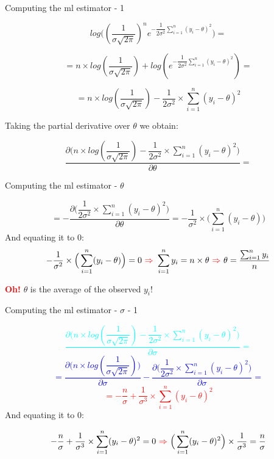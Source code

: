 \documentclass{beamer}
\begin{document}
\begin{frame}
{\centerline{Computing the ml estimator - 1}}

$$log\big((\dfrac 1 {\sigma \sqrt{2 \pi} } )^{n} e^{-   \dfrac { 1 } {2 \sigma^2} \sum_{i=1}^n  ({y_i - \theta})^2} ) =$$

$$= n \times log (\dfrac 1 {\sigma \sqrt{2 \pi} }) + log(e^{ - \dfrac { 1 } {2 \sigma^2} \sum_{i=1}^n  ({y_i - \theta})^2}) =$$

$$= n \times log (\dfrac 1 {\sigma \sqrt{2 \pi} }) - \dfrac { 1 } {2 \sigma^2} \times \sum_{i=1}^n  ({y_i - \theta})^2 $$

Taking the partial derivative over $\theta$ we obtain: 

$$\frac{\partial \Big(n \times log (\dfrac 1 {\sigma \sqrt{2 \pi} }) - \dfrac { 1 } {2 \sigma^2} \times \sum_{i=1}^n  ({y_i - \theta})^2 \Big)}{\partial \theta} = $$


\end{frame}

\begin{frame}
{\centerline{Computing the ml estimator - $\theta$}}

$$ = - \frac{\partial \Big( \dfrac { 1 } {2 \sigma^2} \times \sum_{i=1}^n  ({y_i - \theta})^2 \Big)}{\partial \theta} = - \dfrac { 1 } {\sigma^2} \times \Big( \sum_{i=1}^n  ({y_i - \theta}) \Big) $$
And equating it to 0:
$$ - \dfrac { 1 } {\sigma^2} \times \Big( \sum_{i=1}^n  ({y_i - \theta}) \Big) = 0 ~\textcolor{red}{\Rightarrow}~
 \sum_{i=1}^n y_i = n \times \theta 
~\textcolor{red}{\Rightarrow}~
 \theta = \frac {\sum_{i=1}^n y_i} n  $$
 
\textcolor{red}{\bf Oh!} $\theta$ is the average of the observed $y_i$!

\end{frame}

\begin{frame}
{\centerline{Computing the ml estimator - $\sigma$ - 1}}
\textcolor{cyan}{
$$\frac{\partial \Big(n \times log (\dfrac 1 {\sigma \sqrt{2 \pi} }) - \dfrac { 1 } {2 \sigma^2} \times \sum_{i=1}^n  ({y_i - \theta})^2 \Big)}{\partial \sigma} = $$
}\textcolor{blue}{
$$ = \frac{\partial\Big( n \times log (\dfrac 1 {\sigma \sqrt{2 \pi} })\Big) }{\partial \sigma} - \frac{\partial \Big( \dfrac { 1 } {2 \sigma^2} \times \sum_{i=1}^n  ({y_i - \theta})^2 \Big)}{\partial \sigma} = $$
}\textcolor{red}{
$$  = - \frac n {\sigma} + \frac 1 {\sigma^3} \times \sum_{i=1}^n  ({y_i - \theta})^2$$
}
And equating it to 0:

$$ 
- \frac n {\sigma} + \frac 1 {\sigma^3} \times \sum_{i=1}^n  ({y_i - \theta})^2 = 0 
~\textcolor{red}{\Rightarrow}~
 \Big(\sum_{i=1}^n  ({y_i - \theta})^2 \Big) \times  \frac 1 {\sigma^3} = \frac n {\sigma} 
$$

\end{frame}
\end{document}
